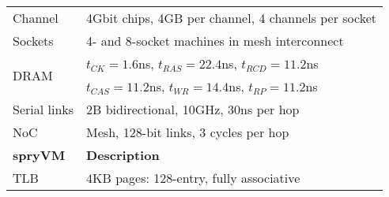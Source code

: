 \begin{table}
\begin{center}
{\begin{tabular}{ l  l }
				
				\multirow{1}{*}{Channel}                                   &  4Gbit chips, 4GB per channel, 4 channels per socket \\         
				\cmidrule{2-2}
				\multirow{1}{*}{Sockets}                             &  4- and 8-socket machines in mesh interconnect\\       
				\cmidrule{2-2}
				\multirow{2}{*}{DRAM}                                &  $t_{CK} = 1.6$ns, $t_{RAS} = 22.4$ns, $t_{RCD} = 11.2$ns \\
				&  $t_{CAS} = 11.2$ns, $t_{WR} = 14.4$ns, $t_{RP} = 11.2$ns \\ 
				\cmidrule{2-2}
				\multirow{1}{*}{Serial links}                             &  2B bidirectional, 10GHz, 30ns per hop~\cite{kanter:cavium, towles:unifying} \\           
				\cmidrule{2-2}
				\multirow{1}{*}{NoC}                             &  Mesh, 128-bit links, 3 cycles per hop \\
				
				\toprule
				{\bf spryVM}                  & {\bf Description}  \\
				\toprule
				\multirow{1}{*}{TLB}	& $4$KB pages: 128-entry, fully associative \\
				
				
				\bottomrule
			\end{tabular}
		} %
	\end{center}
	\vspace{-0.1in}
\end{table}
